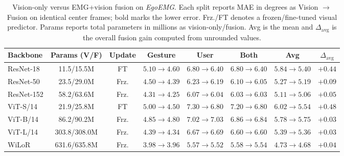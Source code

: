\documentclass[letterpaper]{article} %
\newcommand{\dataset}{\textit{EgoEMG}}
\begin{document}
\begin{table}[t]
\centering
\caption{Vision-only versus EMG+vision fusion on
\dataset{}. Each split reports MAE in degrees as Vision $\rightarrow$ Fusion on
identical center frames; bold marks the lower error. Frz./FT denotes a
frozen/fine-tuned visual predictor. Params reports total parameters in millions
as vision-only/fusion. Avg is the mean and
$\Delta_{\mathrm{avg}}$ is the overall fusion gain computed from unrounded
values.}
\label{tab:egoemg_results}
\footnotesize
\setlength{\tabcolsep}{4.8pt}
\renewcommand{\arraystretch}{1.08}
\begin{tabular}{lccccccc}
\toprule
Backbone & Params (V/F) & Update & Gesture & User & Both & Avg & $\Delta_{\mathrm{avg}}$ \\
\midrule
ResNet-18  & 11.5/15.5M  & FT & $5.10\!\rightarrow\!\mathbf{4.60}$ & $6.80\!\rightarrow\!\mathbf{6.40}$ & $6.80\!\rightarrow\!\mathbf{6.40}$ & $5.84\!\rightarrow\!\mathbf{5.40}$ & $+0.44$ \\
ResNet-50  & 23.5/29.0M  & Frz. & $4.50\!\rightarrow\!\mathbf{4.39}$ & $6.23\!\rightarrow\!\mathbf{6.19}$ & $6.10\!\rightarrow\!\mathbf{6.05}$ & $5.27\!\rightarrow\!\mathbf{5.19}$ & $+0.09$ \\
ResNet-152 & 58.2/63.6M  & Frz. & $4.31\!\rightarrow\!\mathbf{4.25}$ & $6.07\!\rightarrow\!\mathbf{6.04}$ & $6.03\!\rightarrow\!6.03$ & $5.11\!\rightarrow\!\mathbf{5.06}$ & $+0.05$ \\
\midrule
ViT-S/14   & 21.9/25.8M  & FT & $5.00\!\rightarrow\!\mathbf{4.50}$ & $7.30\!\rightarrow\!\mathbf{6.80}$ & $7.20\!\rightarrow\!\mathbf{6.80}$ & $6.02\!\rightarrow\!\mathbf{5.54}$ & $+0.48$ \\
ViT-B/14   & 86.2/90.2M  & Frz. & $4.85\!\rightarrow\!\mathbf{4.80}$ & $\mathbf{7.02}\!\rightarrow\!7.03$ & $6.86\!\rightarrow\!\mathbf{6.84}$ & $5.78\!\rightarrow\!\mathbf{5.75}$ & $+0.03$ \\
ViT-L/14   & 303.8/308.0M & Frz. & $4.39\!\rightarrow\!\mathbf{4.34}$ & $\mathbf{6.67}\!\rightarrow\!6.69$ & $6.60\!\rightarrow\!6.60$ & $5.39\!\rightarrow\!\mathbf{5.36}$ & $+0.03$ \\
\midrule
WiLoR      & 631.6/635.8M & Frz. & $3.98\!\rightarrow\!\mathbf{3.96}$ & $5.57\!\rightarrow\!\mathbf{5.52}$ & $5.58\!\rightarrow\!\mathbf{5.54}$ & $4.73\!\rightarrow\!\mathbf{4.68}$ & $+0.04$ \\
\bottomrule
\end{tabular}

\end{table}
\end{document}
